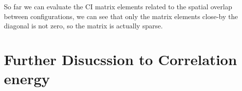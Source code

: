 So far we can evaluate the CI matrix elements related to the spatial
overlap between configurations, we can see that only the matrix
elements close-by the diagonal is not zero, so the matrix is actually
sparse.
\section{Further Disucssion to Correlation energy}
%
%
%
%




